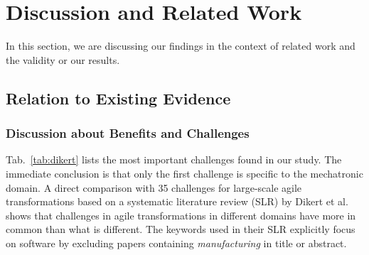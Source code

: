 \documentclass[10pt,a4paper]{IEEEtran} %
\begin{document}

\section{Discussion and Related Work}
\label{sec:related}

In this section, we are discussing our findings in the context of related work and the validity or our results.



\subsection{Relation to Existing Evidence}


\subsubsection{Discussion about Benefits and Challenges}

Tab.~\ref{tab:dikert} lists the most important challenges found in our study. The immediate conclusion is that only the first challenge is specific to the mechatronic domain. A direct comparison with 35 challenges for large-scale agile transformations based on a systematic literature review (SLR) by Dikert et al.~\cite{dikert_challenges_2016} shows that challenges in agile transformations in different domains have more in common than what is different. The keywords used in their SLR explicitly focus on software by excluding papers containing \emph{manufacturing} in title or abstract. 
\end{document}
